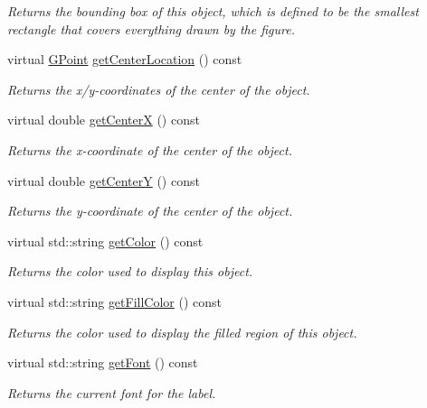 \begin{DoxyCompactItemize}
\begin{DoxyCompactList}\small\item\em Returns the bounding box of this object, which is defined to be the smallest rectangle that covers everything drawn by the figure. \end{DoxyCompactList}\item 
virtual \mbox{\hyperlink{classGPoint}{G\+Point}} \mbox{\hyperlink{classGObject_a0909472e91448470bccdb62ecfb95d8b}{get\+Center\+Location}} () const
\begin{DoxyCompactList}\small\item\em Returns the x/y-\/coordinates of the center of the object. \end{DoxyCompactList}\item 
virtual double \mbox{\hyperlink{classGObject_a04df74355b545e0543112d5b8d924176}{get\+CenterX}} () const
\begin{DoxyCompactList}\small\item\em Returns the {\itshape x}-\/coordinate of the center of the object. \end{DoxyCompactList}\item 
virtual double \mbox{\hyperlink{classGObject_acb3287a3d507025a26f54b895713b947}{get\+CenterY}} () const
\begin{DoxyCompactList}\small\item\em Returns the {\itshape y}-\/coordinate of the center of the object. \end{DoxyCompactList}\item 
virtual std\+::string \mbox{\hyperlink{classGObject_aa061dfa488c31e18549d64363c1d0e34}{get\+Color}} () const
\begin{DoxyCompactList}\small\item\em Returns the color used to display this object. \end{DoxyCompactList}\item 
virtual std\+::string \mbox{\hyperlink{classGObject_a76f6964a11fde7c78e9751be184e1a3c}{get\+Fill\+Color}} () const
\begin{DoxyCompactList}\small\item\em Returns the color used to display the filled region of this object. \end{DoxyCompactList}\item 
virtual std\+::string \mbox{\hyperlink{classGText_a894a5502900794eeb27d084c21f1d77d}{get\+Font}} () const
\begin{DoxyCompactList}\small\item\em Returns the current font for the label. \end{DoxyCompactList}\item 

\end{DoxyCompactItemize}
